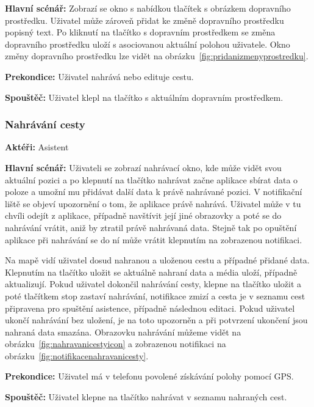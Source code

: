 \documentclass[czech,master,public,dept460,male,java,cpdeclaration]{diploma}
\newcommand{\usecase}[2]{\subsubsection{#1}\label{#2}}
\begin{document}
\vspace{0.1cm}
\noindent
\textbf{Hlavní scénář:} Zobrazí se okno s nabídkou tlačítek s obrázkem dopravního prostředku.
Uživatel může zároveň přidat ke změně dopravního prostředku popisný text. Po kliknutí na
tlačítko s dopravním prostředkem se změna dopravního prostředku uloží s asociovanou aktuální polohou
uživatele. Okno změny dopravního prostředku lze vidět na obrázku~\ref{fig:pridanizmenyprostredku}.

\vspace{0.1cm}
\noindent
\textbf{Prekondice:} Uživatel nahrává nebo edituje cestu.

\vspace{0.1cm}
\noindent
\textbf{Spouštěč:} Uživatel klepl na tlačítko s aktuálním dopravním prostředkem.




\usecase{Nahrávání cesty}{nahravanicesty}
\textbf{Aktéři:} Asistent

\vspace{0.1cm}
\noindent
\textbf{Hlavní scénář:} Uživateli se zobrazí nahrávací okno, kde může vidět svou aktuální pozici
a po klepnutí na tlačítko nahrávat začne aplikace sbírat data o poloze a umožní mu přidávat další data
k právě nahrávané pozici. V notifikační liště se objeví upozornění o tom, že aplikace právě nahrává.
Uživatel může v tu chvíli odejít z aplikace, případně navštívit její jiné obrazovky a poté se do nahrávání vrátit,
aniž by ztratil právě nahrávaná data. Stejně tak po opuštění aplikace při nahrávání se do ní může vrátit
klepnutím na zobrazenou notifikaci.

Na mapě vidí uživatel dosud nahranou a uloženou cestu a případné přidané data.
Klepnutím na tlačítko uložit se aktuálně nahraní data a média uloží, případně aktualizují.
Pokud uživatel dokončil nahrávání cesty, klepne na tlačítko uložit a poté tlačítkem stop zastaví nahrávání,
notifikace zmizí a cesta je v seznamu cest připravena pro spuštění asistence, případně následnou editaci.
Pokud uživatel ukončí nahrávání bez uložení, je na toto upozorněn a při potvrzení ukončení jsou nahraná data
smazána. Obrazovku nahrávání můžeme vidět na obrázku~\ref{fig:nahravanicestyicon} a zobrazenou notifikaci
na obrázku~\ref{fig:notifikacenahravanicesty}.

\vspace{0.1cm}
\noindent
\textbf{Prekondice:} Uživatel má v telefonu povolené získávání polohy pomocí GPS.

\vspace{0.1cm}
\noindent
\textbf{Spouštěč:} Uživatel klepne na tlačítko nahrávat v seznamu nahraných cest.
\end{document}
